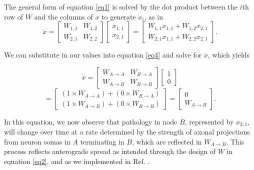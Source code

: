 \documentclass{article}
\begin{document}
\noindent The general form of equation \ref{eq1} is solved by the dot product between the $i$th row of $W$ and the columns of $x$ to generate $\dot{x}_i$, as in
\begin{equation}
\dot{x} = 
\begin{bmatrix}
W_{1,1} & W_{1,2} \\
W_{2,1} & W_{2,2}
\end{bmatrix}
\begin{bmatrix}
x_{1,1} \\
x_{2,1}
\end{bmatrix}
=
\begin{bmatrix}
W_{1,1}x_{1,1} + W_{1,2}x_{2,1} \\
W_{2,1}x_{1,1} + W_{2,2}x_{2,1}
\end{bmatrix}.
\label{eq4}
\end{equation}

\noindent We can substitute in our values into equation \ref{eq4} and solve for $\dot{x}$, which yields

\begin{equation}
\dot{x}=
\begin{bmatrix}
W_{A\rightarrow A} & W_{B\rightarrow A}\\
W_{A\rightarrow B} & 	W_{B\rightarrow B}
\end{bmatrix}
\begin{bmatrix}
1 \\ 0
\end{bmatrix}
\label{eq5}
\end{equation}
\begin{equation}
=
\begin{bmatrix}
(1\times W_{A\rightarrow A}) + (0\times W_{B\rightarrow A}) \\
(1\times W_{A\rightarrow B}) + (0\times W_{B\rightarrow B})
\end{bmatrix}
=
\begin{bmatrix}
0 \\
W_{A\rightarrow B}
\end{bmatrix} .
\label{eq6}
\end{equation}

In this equation, we now observe that pathology in node $B$, represented by $x_{2,1}$, will change over time at a rate determined by the strength of axonal projections from neuron somas in $A$ terminating in $B$, which are reflected in $W_{A\rightarrow B}$. This process reflects anterograde spread as intended through the design of $W$ in equation \ref{eq2}, and as we implemented in Ref. \cite{Henderson2019}. \\
\end{document}
